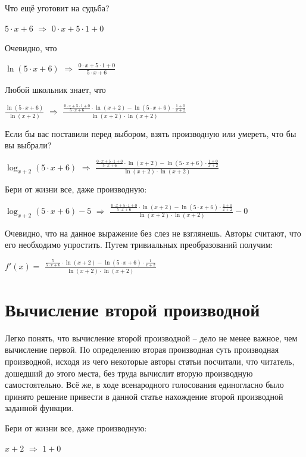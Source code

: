 \documentclass{article}
\begin{document}
Что ещё уготовит на судьба?

$5 \cdot x + 6$ $\Rightarrow$ $0 \cdot x + 5 \cdot 1 + 0$

Очевидно, что

$ \ln (5 \cdot x + 6)$ $\Rightarrow$ $\frac{0 \cdot x + 5 \cdot 1 + 0}{5 \cdot x + 6}$

Любой школьник знает, что

$\frac{ \ln (5 \cdot x + 6)}{ \ln (x + 2)}$ $\Rightarrow$ $\frac{\frac{0 \cdot x + 5 \cdot 1 + 0}{5 \cdot x + 6} \cdot  \ln (x + 2) -  \ln (5 \cdot x + 6) \cdot \frac{1 + 0}{x + 2}}{ \ln (x + 2) \cdot  \ln (x + 2)}$

Если бы вас поставили перед выбором, взять производную или умереть, что бы вы выбрали?

$\log_{x + 2}(5 \cdot x + 6)$ $\Rightarrow$ $\frac{\frac{0 \cdot x + 5 \cdot 1 + 0}{5 \cdot x + 6} \cdot  \ln (x + 2) -  \ln (5 \cdot x + 6) \cdot \frac{1 + 0}{x + 2}}{ \ln (x + 2) \cdot  \ln (x + 2)}$

Бери от жизни все, даже производную:

$\log_{x + 2}(5 \cdot x + 6) - 5$ $\Rightarrow$ $\frac{\frac{0 \cdot x + 5 \cdot 1 + 0}{5 \cdot x + 6} \cdot  \ln (x + 2) -  \ln (5 \cdot x + 6) \cdot \frac{1 + 0}{x + 2}}{ \ln (x + 2) \cdot  \ln (x + 2)} - 0$

Очевидно, что на данное выражение без слез не взглянешь. Авторы считают, что его необходимо упростить. Путем тривиальных преобразований получим:

$f'(x) = $ $\frac{\frac{5}{5 \cdot x + 6} \cdot  \ln (x + 2) -  \ln (5 \cdot x + 6) \cdot \frac{1}{x + 2}}{ \ln (x + 2) \cdot  \ln (x + 2)}$

\section{Вычисление второй производной}

Легко понять, что вычисление второй производной -- дело не менее важное, чем вычисление первой. По определению вторая производная суть производная производной, исходя из чего некоторые авторы статьи посчитали, что читатель, дошедший до этого места, без труда вычислит вторую производную самостоятельно. Всё же, в ходе всенародного голосования единогласно было принято решение привести в данной статье нахождение второй производной заданной функции.

Бери от жизни все, даже производную:

$x + 2$ $\Rightarrow$ $1 + 0$
\end{document}
